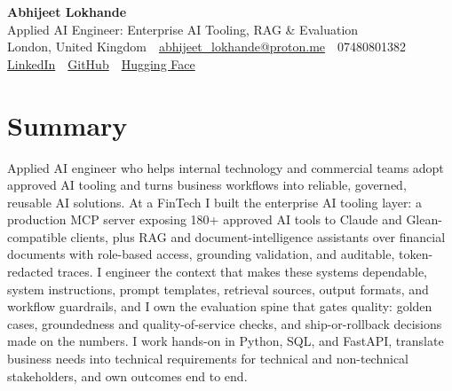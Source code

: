 \documentclass[10pt,a4paper]{article}
\newcommand{\sep}{\,\textcolor{accent!60}{\textbar}\,}
\begin{document}
\begin{center}
  {\fontsize{24}{26}\selectfont\bfseries Abhijeet Lokhande}\\[3pt]
  {\color{accent}\large Applied AI Engineer: Enterprise AI Tooling, RAG \& Evaluation}\\[5pt]
  {\small
    London, United Kingdom \sep
    \href{mailto:abhijeet_lokhande@proton.me}{abhijeet\_lokhande@proton.me} \sep
    07480801382 \\[2pt]
    \href{https://www.linkedin.com/in/ablds/}{LinkedIn} \sep
    \href{https://github.com/abhijeetscode}{GitHub} \sep
    \href{https://huggingface.co/ab-ai}{Hugging Face}
  }
\end{center}
\vspace{2pt}

\section{Summary}
Applied AI engineer who helps internal technology and commercial teams adopt approved AI tooling and turns business workflows into reliable, governed, reusable AI solutions. At a FinTech I built the enterprise AI tooling layer: a production MCP server exposing 180+ approved AI tools to Claude and Glean-compatible clients, plus RAG and document-intelligence assistants over financial documents with role-based access, grounding validation, and auditable, token-redacted traces. I engineer the context that makes these systems dependable, system instructions, prompt templates, retrieval sources, output formats, and workflow guardrails, and I own the evaluation spine that gates quality: golden cases, groundedness and quality-of-service checks, and ship-or-rollback decisions made on the numbers. I work hands-on in Python, SQL, and FastAPI, translate business needs into technical requirements for technical and non-technical stakeholders, and own outcomes end to end.

\end{document}
